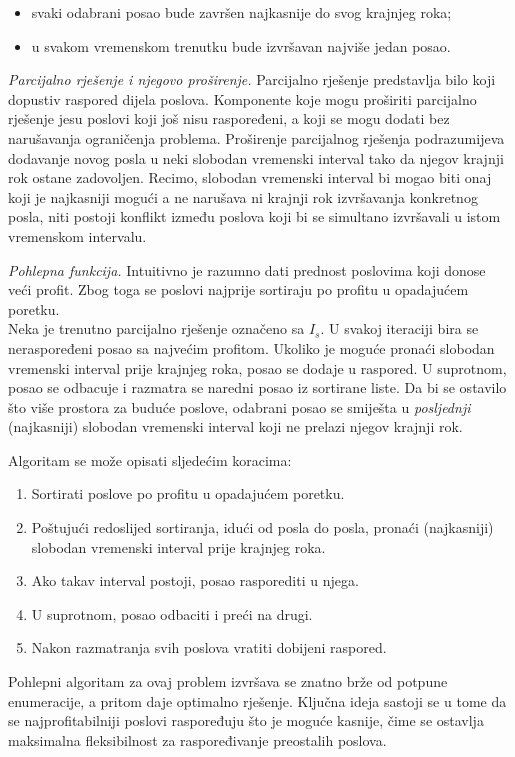 \begin{solution}
	\begin{itemize}
		\item svaki odabrani posao bude završen najkasnije do svog krajnjeg roka;
		\item u svakom vremenskom trenutku bude izvršavan najviše jedan posao.
	\end{itemize}
	
	\medskip
	
	\textit{Parcijalno rješenje i njegovo proširenje.}
	Parcijalno rješenje predstavlja bilo koji dopustiv raspored dijela poslova. Komponente koje mogu proširiti parcijalno rješenje jesu poslovi koji još nisu raspoređeni, a koji se mogu dodati bez narušavanja ograničenja problema. 	Proširenje parcijalnog rješenja podrazumijeva dodavanje novog posla u neki slobodan vremenski interval tako da njegov krajnji rok ostane zadovoljen. Recimo, slobodan vremenski interval bi mogao biti onaj koji je najkasniji mogući a ne narušava ni krajnji rok izvršavanja konkretnog posla, niti postoji konflikt između poslova koji bi se simultano izvršavali u istom vremenskom intervalu. 
	
	\medskip
	
	\textit{Pohlepna funkcija.}
	Intuitivno je razumno dati prednost poslovima koji donose veći profit. Zbog toga se poslovi najprije sortiraju po profitu u opadajućem poretku.\\
	
	Neka je trenutno parcijalno rješenje označeno sa $I_s$. U svakoj iteraciji bira se neraspoređeni posao sa najvećim profitom. Ukoliko je moguće pronaći  slobodan vremenski interval prije krajnjeg roka, posao se dodaje u raspored. U suprotnom, posao se odbacuje i razmatra se naredni posao iz sortirane liste.  Da bi se ostavilo što više prostora za buduće poslove, odabrani posao se smiješta u \textit{posljednji} (najkasniji) slobodan vremenski interval koji ne prelazi njegov krajnji rok.
	
	\medskip
	
	Algoritam se može opisati sljedećim koracima:
	
	\begin{enumerate}
		\item Sortirati poslove po profitu u opadajućem poretku.
		\item Poštujući redoslijed sortiranja, idući od posla do posla, pronaći  (najkasniji) slobodan vremenski interval prije krajnjeg roka.
		\item Ako takav interval postoji, posao rasporediti u njega.
		\item U suprotnom, posao odbaciti i preći na drugi.
		\item Nakon razmatranja svih poslova vratiti dobijeni raspored.
	\end{enumerate}
	
	Pohlepni algoritam za ovaj problem izvršava se znatno brže od potpune enumeracije, a pritom daje optimalno rješenje. Ključna ideja sastoji se u tome da se najprofitabilniji poslovi raspoređuju što je moguće kasnije, čime se ostavlja maksimalna fleksibilnost za raspoređivanje preostalih poslova.
\end{solution}


